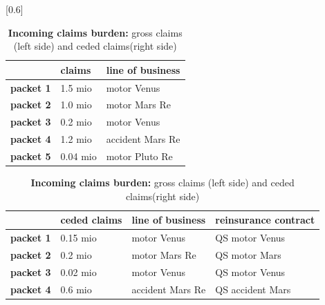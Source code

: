 {\begin{table}[htb!]
\centering
{}[0.6]{
\begin{tabular}{|l|l|l|}
\hline
\rule{0pt}{4ex} & \textbf{claims} & \textbf{line of business} \\
\hline
\rule{0pt}{4ex} {\textbf{packet 1}} & 1.5 mio & {motor Venus} \\
\hline
\rule{0pt}{4ex} {\textbf{packet 2}} & 1.0 mio & {motor Mars Re}\\
\hline
\rule{0pt}{4ex} {\textbf{packet 3} }&0.2 mio & {motor Venus}\\
\hline
\rule{0pt}{4ex} {\textbf{packet 4}} &1.2 mio & {accident Mars Re} \\
\hline
\rule{0pt}{4ex} {\textbf{packet 5}} &0.04 mio &{motor Pluto Re} \\
\hline
\end{tabular}\hspace{0.6cm}
\begin{tabular}{|l|l|l|l|}
\hline
\rule{0pt}{4ex} &\textbf{ceded claims} &\textbf{line of business} &\textbf{reinsurance contract}\\
\hline
\rule{0pt}{4ex} {\textbf{packet 1}} & 0.15 mio & {motor Venus} & QS motor Venus \\
\hline
\rule{0pt}{4ex} {\textbf{packet 2}} & 0.2 mio & {motor Mars Re}& QS motor Mars\\
\hline
\rule{0pt}{4ex} {\textbf{packet 3} }& 0.02 mio & {motor Venus}& QS motor Venus \\
\hline
\rule{0pt}{4ex} {\textbf{packet 4}} &0.6 mio & {accident Mars Re} & QS accident Mars\\
\hline
\end{tabular}}
\caption{\footnotesize{\textbf{Incoming claims burden:} gross claims (left side) and ceded claims(right side)}}
\label{table:claims}
\end{table}

}
